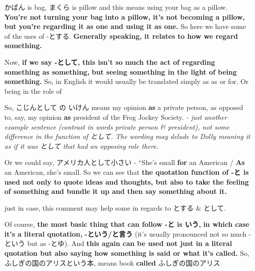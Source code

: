かばん is bag, まくら is pillow and this means using your bag as a pillow. {\bf You're not turning your bag into a pillow, it's not becoming a pillow,} {\bf but you're regarding it as one and using it as one.} So here we have some of the uses of -とする. {\bf Generally speaking, it relates to how we regard something.}

\stopsectionlevel

\stopsectionlevel

\startsectionlevel[title={として},reference={として}]

Now, {\bf if we say -として, this isn't so much the act of regarding something as something,} {\bf but seeing something in the light of being something.} So, in English it would usually be translated simply as as or for. Or being in the role of

{}

So, こじんとして の いけん means my opinion {\bf as} a private person, as opposed to, say, my opinion {\bf as} president of the Frog Jockey Society. {\em - just another example sentence (contrast in words private person & president), not some difference in the function of として. The wording may delude to Dolly meaning it as if it was として that had an opposing role there.}

Or we could say, アメリカ人として小さい - “She's small {\bf for} an American / {\bf As} an American, she's small. So we can see that {\bf the quotation function of -と is used not only to quote ideas and thoughts, but also to take the feeling of something and bundle it up and then say something about it.}

just in case, this comment may help some in regards to とする & として.

{}

\stopsectionlevel

\startsectionlevel[title={という / と言う},reference={という-と言う}]

Of course, {\bf the most basic thing that can follow -と is いう,} {\bf in which case it's a literal quotation,} {\bf -という/と言う} (it's usually pronounced not so much -という but as -とゆ). And {\bf this again can be used not just in a literal quotation but also saying how something is said or what it's called.} So, ふしぎの国のアリスという本, means book {\bf called} ふしぎの国のアリス

{}

\startsectionlevel[title={っていう / って言う},reference={っていう-って言う}]

